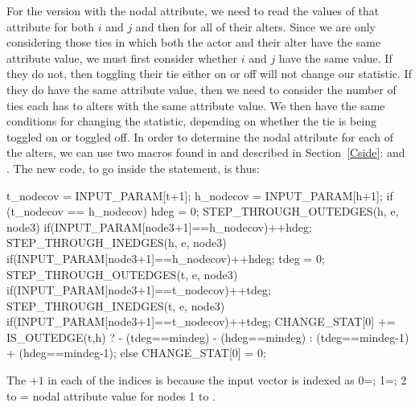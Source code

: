 \documentclass[nojss]{jss}
\begin{document}
For the version with the nodal attribute, we need to read the values of that attribute for both $i$ and $j$ and then for all of their alters.  Since we are only considering those ties in which both the actor and their alter have the same attribute value, we must first consider whether $i$ and $j$ have the same value.  If they do not, then toggling their tie either on or off will not change our statistic. If they do have the same attribute value, then we need to consider the number of ties each has to alters with the same attribute value. We then have the same conditions for changing the statistic, depending on whether the tie is being toggled on or toggled off. In order to determine the nodal attribute for each of the alters, we can use two macros found in  and described in Section~\ref{Cside}:  and . The new code, to go inside the  statement, is thus:
\begin{CodeChunk}
\begin{CodeInput}
      t_nodecov = INPUT_PARAM[t+1];
      h_nodecov = INPUT_PARAM[h+1];
      if (t_nodecov == h_nodecov) {
        hdeg = 0;
        STEP_THROUGH_OUTEDGES(h, e, node3) {
          if(INPUT_PARAM[node3+1]==h_nodecov){++hdeg;}
        }
        STEP_THROUGH_INEDGES(h, e, node3) {
          if(INPUT_PARAM[node3+1]==h_nodecov){++hdeg;}
        }
        tdeg = 0;
        STEP_THROUGH_OUTEDGES(t, e, node3) {
          if(INPUT_PARAM[node3+1]==t_nodecov){++tdeg;}
        }
        STEP_THROUGH_INEDGES(t, e, node3) {
          if(INPUT_PARAM[node3+1]==t_nodecov){++tdeg;}
        }
        CHANGE_STAT[0] += IS_OUTEDGE(t,h) ?
          - (tdeg==mindeg) - (hdeg==mindeg) :
          (tdeg==mindeg-1) + (hdeg==mindeg-1);
      }else{
        CHANGE_STAT[0] = 0;
      }

\end{CodeInput}
\end{CodeChunk}
The $+1$ in each of the  indices is because the input vector
is indexed as 0=; 1=; 2 to  = nodal
attribute value for nodes 1 to .
\end{document}
